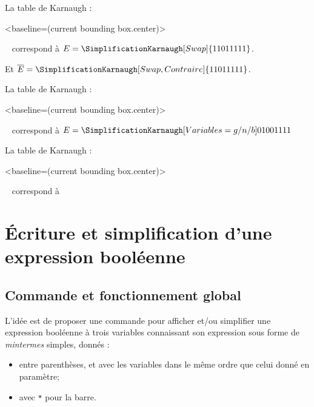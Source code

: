 \documentclass[french,a4paper,11pt]{article}
\begin{document}
{{\begin{DemoCode}
La table de Karnaugh :
\begin{TableKarnaugh}[Swap]<baseline=(current bounding box.center)>
\end{TableKarnaugh}~
correspond à $E=\SimplificationKarnaugh[Swap]{11011111}$.

Et $\overline{E}=\SimplificationKarnaugh[Swap,Contraire]{11011111}$.
\end{DemoCode}

\begin{DemoCode}
La table de Karnaugh :
\begin{TableKarnaugh}[Variables={g/n/b}]<baseline=(current bounding box.center)>
\end{TableKarnaugh}~
correspond à $E=\SimplificationKarnaugh[Variables={g/n/b}]{01001111}$
\end{DemoCode}

\begin{DemoCode}
La table de Karnaugh :
\begin{TableKarnaugh}[StyleAlternatif]<baseline=(current bounding box.center)>
\end{TableKarnaugh}~
correspond à 
\end{DemoCode}

\pagebreak

\section{Écriture et simplification d'une expression booléenne}

\subsection{Commande et fonctionnement global}

\begin{cautionblock}
L'idée est de proposer une commande pour afficher et/ou simplifier une expression booléenne à trois variables connaissant son expression sous forme de \textit{mintermes} simples, donnés :
%
\begin{itemize}
	\item entre parenthèses, et avec les variables dans le même ordre que celui donné en paramètre;
	\item avec \texttt{*} pour la barre.
\end{itemize}


\end{cautionblock}}}
\end{document}
